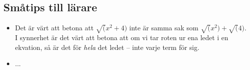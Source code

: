\documentclass[12pt]{article}
\begin{document}
  \subsection{Småtips till lärare}
  \begin{itemize}
    \item Det är värt att betona att $\sqrt(x^2+4)$ inte är samma sak som $\sqrt(x^2)+\sqrt(4)$.
    I synnerhet är det värt att betona att om vi tar roten ur ena ledet i en ekvation, så är det för \emph{hela} det ledet -- inte varje term för sig.
    \item ...
  \end{itemize}
\end{document}
